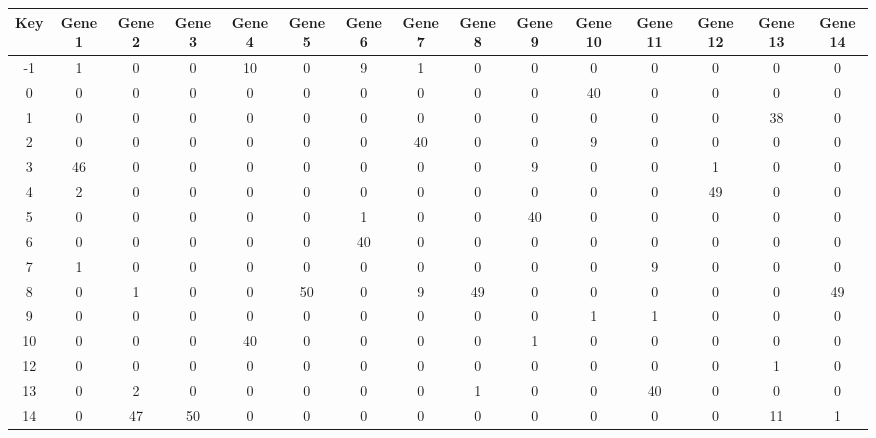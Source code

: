 \begin{tabular}{|c|c|c|c|c|c|c|c|c|c|c|c|c|c|c|}
\hline
Key & Gene 1 & Gene 2 & Gene 3 & Gene 4 & Gene 5 & Gene 6 & Gene 7 & Gene 8 & Gene 9 & Gene 10 & Gene 11 & Gene 12 & Gene 13 & Gene 14 \\
\hline
-1 & 1 & 0 & 0 & 10 & 0 & 9 & 1 & 0 & 0 & 0 & 0 & 0 & 0 & 0 \\
0 & 0 & 0 & 0 & 0 & 0 & 0 & 0 & 0 & 0 & 40 & 0 & 0 & 0 & 0 \\
1 & 0 & 0 & 0 & 0 & 0 & 0 & 0 & 0 & 0 & 0 & 0 & 0 & 38 & 0 \\
2 & 0 & 0 & 0 & 0 & 0 & 0 & 40 & 0 & 0 & 9 & 0 & 0 & 0 & 0 \\
3 & 46 & 0 & 0 & 0 & 0 & 0 & 0 & 0 & 9 & 0 & 0 & 1 & 0 & 0 \\
4 & 2 & 0 & 0 & 0 & 0 & 0 & 0 & 0 & 0 & 0 & 0 & 49 & 0 & 0 \\
5 & 0 & 0 & 0 & 0 & 0 & 1 & 0 & 0 & 40 & 0 & 0 & 0 & 0 & 0 \\
6 & 0 & 0 & 0 & 0 & 0 & 40 & 0 & 0 & 0 & 0 & 0 & 0 & 0 & 0 \\
7 & 1 & 0 & 0 & 0 & 0 & 0 & 0 & 0 & 0 & 0 & 9 & 0 & 0 & 0 \\
8 & 0 & 1 & 0 & 0 & 50 & 0 & 9 & 49 & 0 & 0 & 0 & 0 & 0 & 49 \\
9 & 0 & 0 & 0 & 0 & 0 & 0 & 0 & 0 & 0 & 1 & 1 & 0 & 0 & 0 \\
10 & 0 & 0 & 0 & 40 & 0 & 0 & 0 & 0 & 1 & 0 & 0 & 0 & 0 & 0 \\
12 & 0 & 0 & 0 & 0 & 0 & 0 & 0 & 0 & 0 & 0 & 0 & 0 & 1 & 0 \\
13 & 0 & 2 & 0 & 0 & 0 & 0 & 0 & 1 & 0 & 0 & 40 & 0 & 0 & 0 \\
14 & 0 & 47 & 50 & 0 & 0 & 0 & 0 & 0 & 0 & 0 & 0 & 0 & 11 & 1 \\
\hline
\end{tabular}